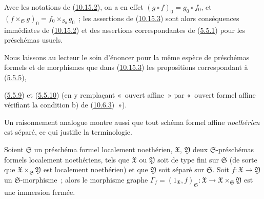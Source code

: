 Avec les notations de (\hyperref[I.10.15.2-fr]{10.15.2}), on a en effet
$(g\circ f)_0=g_0\circ f_0$, et
$(f\times_{\mathfrak{S}}g)_0=f_0\times_{S_0}g_0$~; les assertions de
(\hyperref[I.10.15.3-fr]{10.15.3}) sont alors conséquences immédiates de
(\hyperref[I.10.15.2-fr]{10.15.2}) et des assertions correspondantes de
(\hyperref[I.5.5.1-fr]{5.5.1}) pour les préschémas usuels.

Nous laissons au lecteur le soin d'énoncer pour la même espèce de
préschémas formels et de morphismes que dans
(\hyperref[I.10.15.3-fr]{10.15.3}) les propositions correspondant à
(\hyperref[I.5.5.5-fr]{5.5.5}),

(\hyperref[I.5.5.9-fr]{5.5.9}) et
(\hyperref[I.5.5.10-fr]{5.5.10}) (en y remplaçant «~ouvert affine~» par
«~ouvert formel affine vérifiant la condition b) de
(\hyperref[I.10.6.3-fr]{10.6.3})~»).

Un raisonnement analogue montre aussi que tout schéma formel affine
\emph{noethérien} est séparé, ce qui justifie la terminologie.

\begin{proposition}[10.15.4]
\label{I.10.15.4-fr}
Soient $\mathfrak{S}$ un préschéma formel localement noethérien,
$\mathfrak{X}$, $\mathfrak{Y}$ deux $\mathfrak{S}$-préschémas formels
localement noethériens, tels que $\mathfrak{X}$ ou $\mathfrak{Y}$ soit de
type fini sur $\mathfrak{S}$ (de sorte que
$\mathfrak{X}\times_{\mathfrak{S}}\mathfrak{Y}$ est localement noethérien)
et que $\mathfrak{Y}$ soit séparé sur $\mathfrak{S}$. Soit
$f:\mathfrak{X}\to\mathfrak{Y}$ un $\mathfrak{S}$-morphisme~; alors le
morphisme graphe
$\Gamma_f=(1_{\mathfrak{X}},f)_{\mathfrak{S}}:\mathfrak{X}\to
\mathfrak{X}\times_{\mathfrak{S}}\mathfrak{Y}$ est une immersion fermée.
\end{proposition}

